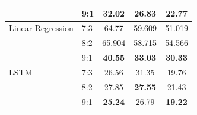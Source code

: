 \documentclass[conference]{IEEEtran}
\begin{document}
\begin{table}[H]
\begin{tabular}{|l|l|c|c|c|}
                               & 9:1                         & \textbf{32.02}            & \textbf{26.83}                 & \textbf{22.77}           \\ \hline
        Linear Regression      & 7:3                         & 64.77                     & 59.609                         & 51.019                   \\ \cline{2-5}
                               & 8:2                         & 65.904                    & 58.715                         & 54.566                   \\ \cline{2-5}
                               & 9:1                         & \textbf{40.55}            & \textbf{33.03}                 & \textbf{30.33}           \\ \hline
        LSTM                   & 7:3                         & 26.56                     & 31.35                          & 19.76                    \\ \cline{2-5}
                               & 8:2                         & 27.85                     & \textbf{27.55}                 & 21.43                    \\ \cline{2-5}
                               & 9:1                         & \textbf{25.24}            & 26.79                          & \textbf{19.22}           \\ \hline
    \end{tabular}
    \label{mbbresult}
\end{table}
\end{document}
